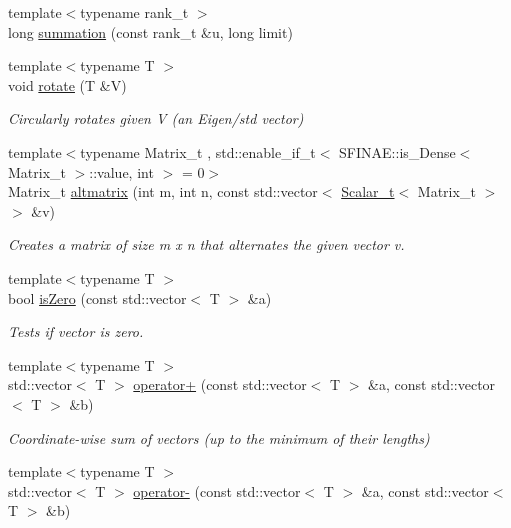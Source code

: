 \begin{DoxyCompactItemize}
{\footnotesize template$<$typename rank\+\_\+t $>$ }\\long \hyperlink{namespaceMackey_adf2e9770c170152b22ca8125f96df8d1}{summation} (const rank\+\_\+t \&u, long limit)
\item 
{\footnotesize template$<$typename T $>$ }\\void \hyperlink{namespaceMackey_a38a833de54971845cbdb8c96f830725b}{rotate} (T \&V)
\begin{DoxyCompactList}\small\item\em Circularly rotates given V (an Eigen/std vector) \end{DoxyCompactList}\item 
{\footnotesize template$<$typename Matrix\+\_\+t , std\+::enable\+\_\+if\+\_\+t$<$ S\+F\+I\+N\+A\+E\+::is\+\_\+\+Dense$<$ Matrix\+\_\+t $>$\+::value, int $>$  = 0$>$ }\\Matrix\+\_\+t \hyperlink{namespaceMackey_aa2f105c9bcbec7f5c7524027174340a0}{altmatrix} (int m, int n, const std\+::vector$<$ \hyperlink{namespaceMackey_a93ba297573961f91101fb84bc84bbe95}{Scalar\+\_\+t}$<$ Matrix\+\_\+t $>$$>$ \&v)
\begin{DoxyCompactList}\small\item\em Creates a matrix of size m x n that alternates the given vector v. \end{DoxyCompactList}\item 
{\footnotesize template$<$typename T $>$ }\\bool \hyperlink{namespaceMackey_a4c3647777bc890a4649ae24b138bbb79}{is\+Zero} (const std\+::vector$<$ T $>$ \&a)
\begin{DoxyCompactList}\small\item\em Tests if vector is zero. \end{DoxyCompactList}\item 
{\footnotesize template$<$typename T $>$ }\\std\+::vector$<$ T $>$ \hyperlink{namespaceMackey_adb4974b5ffe533abb955ccb6b9096155}{operator+} (const std\+::vector$<$ T $>$ \&a, const std\+::vector$<$ T $>$ \&b)
\begin{DoxyCompactList}\small\item\em Coordinate-\/wise sum of vectors (up to the minimum of their lengths) \end{DoxyCompactList}\item 
{\footnotesize template$<$typename T $>$ }\\std\+::vector$<$ T $>$ \hyperlink{namespaceMackey_ae86e49097ef9a09ebcd0173881e88786}{operator-\/} (const std\+::vector$<$ T $>$ \&a, const std\+::vector$<$ T $>$ \&b)
$$
\end{DoxyCompactItemize}
